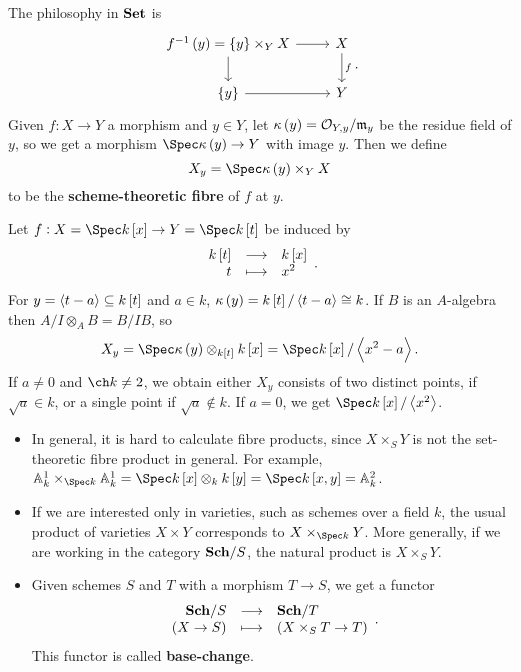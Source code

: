 The philosophy in $ \textbf{Set} $ is
$$
\begin{tikzcd}
f^{-1}\br{y} = \cbr{y} \times_Y X \arrow{r} \arrow{d} & X \arrow{d}{f} \\
\cbr{y} \arrow{r} & Y
\end{tikzcd}.
$$
Given $ f : X \to Y $ a morphism and $ y \in Y $, let $ \kappa\br{y} = \OOO_{Y, y} / \mmm_y $ be the residue field of $ y $, so we get a morphism $ \Spec \kappa\br{y} \to Y $ with image $ y $. Then we define
$$ X_y = \Spec \kappa\br{y} \times_Y X $$
to be the \textbf{scheme-theoretic fibre} of $ f $ at $ y $.

\begin{example*}
Let $ f : X = \Spec k\sbr{x} \to Y = \Spec k\sbr{t} $ be induced by
$$ \function{k\sbr{t}}{k\sbr{x}}{t}{x^2}. $$
For $ y = \abr{t - a} \subseteq k\sbr{t} $ and $ a \in k $, $ \kappa\br{y} = k\sbr{t} / \abr{t - a} \cong k $. If $ B $ is an $ A $-algebra then $ A / I \otimes_A B = B / IB $, so
$$ X_y = \Spec \kappa\br{y} \otimes_{k\sbr{t}} k\sbr{x} = \Spec k\sbr{x} / \abr{x^2 - a}. $$
If $ a \ne 0 $ and $ \ch k \ne 2 $, we obtain either $ X_y $ consists of two distinct points, if $ \sqrt{a} \in k $, or a single point if $ \sqrt{a} \notin k $. If $ a = 0 $, we get $ \Spec k\sbr{x} / \abr{x^2} $.
\end{example*}

\begin{remark*}
\hfill
\begin{itemize}
\item In general, it is hard to calculate fibre products, since $ X \times_S Y $ is not the set-theoretic fibre product in general. For example, $ \AA_k^1 \times_{\Spec k} \AA_k^1 = \Spec k\sbr{x} \otimes_k k\sbr{y} = \Spec k\sbr{x, y} = \AA_k^2 $.
\item If we are interested only in varieties, such as schemes over a field $ k $, the usual product of varieties $ X \times Y $ corresponds to $ X \times_{\Spec k} Y $. More generally, if we are working in the category $ \textbf{Sch} / S $, the natural product is $ X \times_S Y $.
\item Given schemes $ S $ and $ T $ with a morphism $ T \to S $, we get a functor
$$ \function{\Sch / S}{\Sch / T}{\br{X \to S}}{\br{X \times_S T \to T}}. $$
This functor is called \textbf{base-change}.
\end{itemize}
\end{remark*}

\pagebreak


